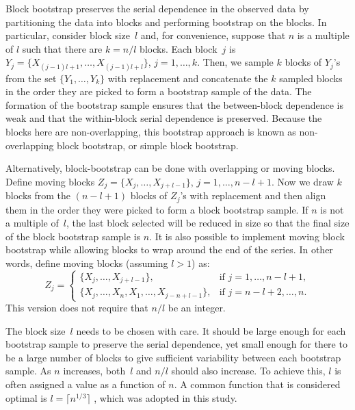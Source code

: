\documentclass[12pt, letterpaper, titlepage]{article}
\begin{document}
Block bootstrap preserves the serial dependence in the observed data by
partitioning the data into blocks and performing bootstrap on the blocks.
In particular, consider block size~$l$ and, for convenience, suppose that
$n$ is a multiple of $l$ such that there are $k = n / l$ blocks. Each block~$j$
is $Y_j = \{X_{(j - 1) l + 1}, \ldots, X_{(j - 1) l + l}\}$,
$j = 1, \ldots,   k$.  Then, we sample $k$ blocks of $Y_j$'s from the set 
$\{Y_1, \ldots, Y_k\}$ with replacement and concatenate the $k$ sampled blocks
in the order they are picked to form a bootstrap sample of the data. The
formation of the bootstrap sample ensures that the between-block dependence is
weak and that the within-block serial dependence is preserved. Because the
blocks here are non-overlapping, this bootstrap approach is known as
non-overlapping block bootstrap, or simple block bootstrap.

Alternatively, block-bootstrap can be done with overlapping or moving blocks.
Define moving blocks $Z_j = \{X_j, \ldots, X_{j + l - 1}\}$,
$j = 1, \ldots, n - l + 1$. Now we draw $k$ blocks from the $(n - l + 1)$
blocks
of $Z_j$'s with replacement and then align them in the order they were
picked
to form a block bootstrap sample. If $n$ is not a multiple of~$l$, the last
block selected will be reduced in size so that the final size of the
block bootstrap sample is $n$. It is also possible to implement moving block
bootstrap while allowing blocks to wrap around the end of the series. In other
words, define moving blocks (assuming $l > 1$) as:
\begin{equation}
Z_j =
    \begin{cases}
        \{X_j, \ldots, X_{j + l - 1}\}, & \text{if } j = 1, \dots, n - l + 1,\\
        \{X_j, \ldots, X_n, X_1, \ldots, X_{j-n+l-1}\}, & \text{if } j = n - l
        + 2 ,\dots, n.
    \end{cases}
\end{equation}
This version does not require that $n/l$ be an integer.

The block size~$l$ needs to be chosen with care. It should be large enough for
each bootstrap sample to preserve the serial dependence, yet small enough for
there to be a large number of blocks to give sufficient variability between
each bootstrap sample. As $n$ increases, both~$l$
and $n / l$ should also increase. To achieve this, $l$ is
often assigned a value as a function of $n$. A common function that is
considered optimal is $l = \lceil n^{1/3} \rceil$
\citep{buhlmann1999block}, which was adopted in this study.
\end{document}
